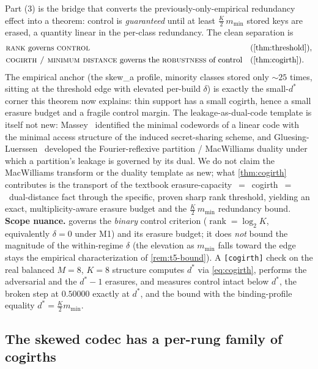 \documentclass[11pt]{article}
\theoremstyle{definition}
\theoremstyle{plain}
\theoremstyle{remark}
\DeclareMathOperator{\rank}{rank}
\begin{document}
Part (3) is the bridge that converts the previously-only-empirical redundancy effect into
a theorem: control is \emph{guaranteed} until at least $\tfrac{K}{2}\,m_{\min}$ stored keys
are erased, a quantity linear in the per-class redundancy. The clean separation is
\[
  \begin{aligned}
    &\text{\textsc{rank} governs \textsc{control}}
      &&\text{(\cref{thm:threshold})}, \\
    &\text{\textsc{cogirth / minimum distance} governs the \textsc{robustness} of control}
      &&\text{(\cref{thm:cogirth})}.
  \end{aligned}
\]
The empirical anchor (the skew\_a profile, minority classes stored only $\sim 25$ times,
sitting at the threshold edge with elevated per-build $\delta$) is exactly the small-$d^\ast$
corner this theorem now explains: thin support has a small cogirth, hence a small erasure
budget and a fragile control margin. The leakage-as-dual-code template is itself not new:
Massey~\cite{massey1993minimal} identified the minimal codewords of a linear code with the
minimal access structure of the induced secret-sharing scheme, and
Gluesing-Luerssen~\cite{gluesingluerssen2014fourier} developed the Fourier-reflexive
partition / MacWilliams duality under which a partition's leakage is governed by its dual.
We do not claim the MacWilliams transform or the duality template as new; what
\cref{thm:cogirth} contributes is the transport of the textbook
erasure-capacity~$=$~cogirth~$=$~dual-distance fact through the specific, proven sharp rank
threshold, yielding an exact, multiplicity-aware erasure budget and the
$\tfrac{K}{2}\,m_{\min}$ redundancy bound. \textbf{Scope nuance.}  governs
the \emph{binary} control criterion ($\rank = \log_2 K$, equivalently $\delta = 0$ under
M1) and its erasure budget; it does \emph{not} bound the magnitude of the within-regime
$\delta$ (the elevation as $m_{\min}$ falls toward the edge stays the empirical
characterization of \cref{rem:t5-bound}). A \texttt{[cogirth]} check on the real balanced
$M = 8$, $K = 8$ structure computes $d^\ast$ via \eqref{eq:cogirth}, performs the
adversarial and the $d^\ast - 1$ erasures, and measures control intact below $d^\ast$, the
broken step at $0.50000$ exactly at $d^\ast$, and the bound with the binding-profile
equality $d^\ast = \tfrac{K}{2}m_{\min}$.

\subsection{The skewed codec has a per-rung family of cogirths}
\label{sec:t5c}
\end{document}
